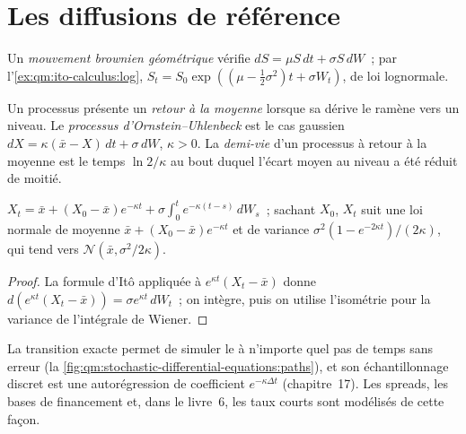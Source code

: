 \section{Les diffusions de référence}

\begin{definition}\label{def:qm:stochastic-differential-equations:gbm}
Un \emph{mouvement brownien géométrique} vérifie $dS = \mu S\,dt + \sigma
S\,dW$~; par l'\cref{ex:qm:ito-calculus:log}, $S_t = S_0\exp((\mu - \tfrac12\sigma^2)t + \sigma W_t)$, de loi lognormale.
\end{definition}

\begin{definition}\label{def:qm:stochastic-differential-equations:ou}
Un processus présente un \emph{retour à la moyenne} lorsque sa dérive le ramène vers un niveau.
Le \emph{processus d'Ornstein--Uhlenbeck} est le cas gaussien
$dX = \kappa(\bar x - X)\,dt + \sigma\,dW$, $\kappa > 0$. La \emph{demi-vie} d'un
processus à retour à la moyenne est le temps $\ln 2/\kappa$ au bout duquel l'écart moyen au
niveau a été réduit de moitié.
\end{definition}

\begin{proposition}\label{prop:qm:stochastic-differential-equations:ou}
$X_t = \bar x + (X_0 - \bar x)e^{-\kappa t} + \sigma\int_0^te^{-\kappa(t-s)}\,dW_s$~; sachant $X_0$, $X_t$ suit
une loi normale de moyenne $\bar x + (X_0 - \bar x)e^{-\kappa t}$ et de variance $\sigma^2(1 - e^{-2\kappa t})/(2\kappa)$,
qui tend vers $\mathcal N(\bar x, \sigma^2/2\kappa)$.
\end{proposition}

\begin{proof}
La formule d'Itô appliquée à $e^{\kappa t}(X_t - \bar x)$ donne $d(e^{\kappa t}(X_t - \bar x)) = \sigma e^{\kappa t}\,dW_t$~;
on intègre, puis on utilise l'isométrie pour la variance de l'intégrale de Wiener.
\end{proof}

La transition exacte permet de simuler le  à n'importe quel pas de temps
sans erreur (la \cref{fig:qm:stochastic-differential-equations:paths}), et son échantillonnage discret
est une autorégression de coefficient $e^{-\kappa\Delta t}$ (chapitre~17). Les spreads, les bases de
financement et, dans le livre~6, les taux courts sont modélisés de cette façon.

